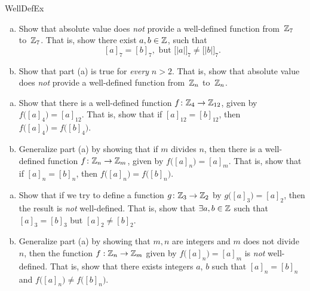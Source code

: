 \begin{exercise}{WellDefEx}
\begin{enumerate}[(a)]
\item  \label{WellDefEx-AbsVal0}
 Show that absolute value does \emph{not} provide a well-defined function from~$\mathbb{Z}_7$ to~$\mathbb{Z}_7$. That is, show there exist $a,b \in \mathbb{Z}$, such that 
\[ [a]_7 = [b]_7, \text{ but } \bigl[ |a| \bigr]_7 \neq \bigl[ |b| \bigr]_7.\]
\item  \label{WellDefEx-AbsVal}
 Show that part (a) is true for \emph{every} $n > 2$. That is, show that  absolute value does \emph{not} provide a well-defined function from~$\mathbb{Z}_n$ to~$\mathbb{Z}_n$. 
\end{enumerate}
\end{exercise}

\begin{exercise}{57}
\begin{enumerate}[(a)]
\item
Show that there is a well-defined function 
$f \colon \mathbb{Z}_4 \to \mathbb{Z}_{12}$, given by \\
$ f \bigl( [a]_4 \bigr) = [a]_{12}$. 
That is, show that if $[a]_{12} = [b]_{12}$, then $f \bigl( [a]_4 \bigr) = f \bigl( [b]_4 \bigr)$.
\item  \label{WellDefEx-divide}
Generalize part (a) by showing that if $m$ divides $n$, then there is a well-defined function 
$f \colon \mathbb{Z}_n \to \mathbb{Z}_m$, given by $f \bigl( [a]_n \bigr) = [a]_m$.
That is, show that if $[a]_n = [b]_n$, then $f \bigl( [a]_n \bigr) = f \bigl( [b]_n \bigr)$.
\end{enumerate}
\end{exercise}

\begin{exercise}{}
\begin{enumerate}[(a)]
\item  \label{WellDefEx-odd2}
 Show that if we try to define a function $g \colon \mathbb{Z}_3 \to \mathbb{Z}_2$ by $g \bigl( [a]_3 \bigr) = [a]_2$, then the result is \emph{not} well-defined. That is, show that $\exists a, b \in \mathbb{Z}$ such that
$[a]_3 = [b]_3$  but $[a]_2 \neq [b]_2.$
\item
Generalize part (a) by showing that $m, n$ are integers and $m$ does not divide $n$, then the function 
$f: \mathbb{Z}_n \to \mathbb{Z}_m$  given by $f \bigl( [a]_n \bigr) = [a]_m$ is \emph{not} well-defined.
That is, show that there exists integers $a$, $b$ such that $[a]_n = [b]_n$ and $f \bigl( [a]_n \bigr) \neq f \bigl( [b]_n \bigr)$.
\end{enumerate}
\end{exercise}


